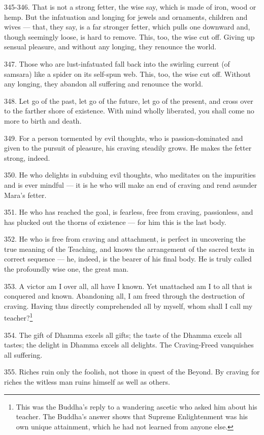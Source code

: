 345-346. That is not a strong fetter, the wise say, which is made of iron, wood or hemp. But the infatuation and longing for jewels and ornaments, children and wives — that, they say, is a far stronger fetter, which pulls one downward and, though seemingly loose, is hard to remove. This, too, the wise cut off. Giving up sensual pleasure, and without any longing, they renounce the world.

347. Those who are lust-infatuated fall back into the swirling current (of samsara) like a spider on its self-spun web. This, too, the wise cut off. Without any longing, they abandon all suffering and renounce the world.

348. Let go of the past, let go of the future, let go of the present, and cross over to the farther shore of existence. With mind wholly liberated, you shall come no more to birth and death.

349. For a person tormented by evil thoughts, who is passion-dominated and given to the pursuit of pleasure, his craving steadily grows. He makes the fetter strong, indeed.

350. He who delights in subduing evil thoughts, who meditates on the impurities and is ever mindful — it is he who will make an end of craving and rend asunder Mara's fetter.

351. He who has reached the goal, is fearless, free from craving, passionless, and has plucked out the thorns of existence — for him this is the last body.

352. He who is free from craving and attachment, is perfect in uncovering the true meaning of the Teaching, and knows the arrangement of the sacred texts in correct sequence — he, indeed, is the bearer of his final body. He is truly called the profoundly wise one, the great man.

353. A victor am I over all, all have I known. Yet unattached am I to all that is conquered and known. Abandoning all, I am freed through the destruction of craving. Having thus directly comprehended all by myself, whom shall I call my teacher?\footnote{This was the Buddha's reply to a wandering ascetic who asked him about his teacher. The Buddha's answer shows that Supreme Enlightenment was his own unique attainment, which he had not learned from anyone else.}

354. The gift of Dhamma excels all gifts; the taste of the Dhamma excels all tastes; the delight in Dhamma excels all delights. The Craving-Freed vanquishes all suffering.

355. Riches ruin only the foolish, not those in quest of the Beyond. By craving for riches the witless man ruins himself as well as others.


